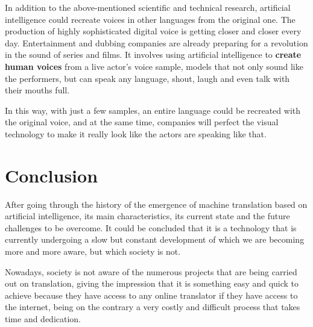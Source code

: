 \documentclass[a4paper]{article}
\theoremstyle{plain}
\theoremstyle{definition}
\begin{document}
In addition to the above-mentioned scientific and technical research, artificial intelligence could recreate voices in other languages from the original one. The production of highly sophisticated digital voice is getting closer and closer every day. Entertainment and dubbing companies are already preparing for a revolution in the sound of series and films. It involves using artificial intelligence to \textbf{create human voices} from a live actor's voice sample, models that not only sound like the performers, but can speak any language, shout, laugh and even talk with their mouths full.\newline

In this way, with just a few samples, an entire language could be recreated with the original voice, and at the same time, companies will perfect the visual technology to make it really look like the actors are speaking like that.


	
	\section{Conclusion}

	After going through the history of the emergence of machine translation based on artificial intelligence, its main characteristics, its current state and the future challenges to be overcome. It could be concluded that it is a technology that is currently undergoing a slow but constant development of which we are becoming more and more aware, but which society is not.\newline
	
    Nowadays, society is not aware of the numerous projects that are being carried out on translation, giving the impression that it is something easy and quick to achieve because they have access to any online translator if they have access to the internet, being on the contrary a very costly and difficult process that takes time and dedication.

	
	

	
	\newpage
   
\end{document}
